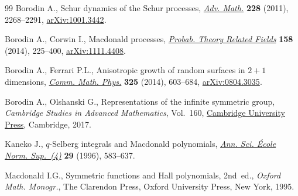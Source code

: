 \documentclass[11pt]{article}
\numberwithin{equation}{section}
\numberwithin{equation}{section}
\begin{document}
\begin{thebibliography}{99}
Borodin A., Schur dynamics of the {S}chur processes, \href{https://doi.org/10.1016/j.aim.2011.06.038}{\textit{Adv. Math.}}
 \textbf{228} (2011), 2268--2291, \href{https://arxiv.org/abs/1001.3442}{arXiv:1001.3442}.

Borodin A., Corwin I., Macdonald processes, \href{https://doi.org/10.1007/s00440-013-0482-3}{\textit{Probab. Theory Related
 Fields}} \textbf{158} (2014), 225--400, \href{https://arxiv.org/abs/1111.4408}{arXiv:1111.4408}.

Borodin A., Ferrari P.L., Anisotropic growth of random surfaces in {$2+1$}
 dimensions, \href{https://doi.org/10.1007/s00220-013-1823-x}{\textit{Comm. Math. Phys.}} \textbf{325} (2014), 603--684,
 \href{https://arxiv.org/abs/0804.3035}{arXiv:0804.3035}.

Borodin A., Olshanski G., Representations of the infinite symmetric group,
 \textit{Cambridge Studies in Advanced Mathematics}, Vol.~160, \href{https://doi.org/10.1017/CBO9781316798577}{Cambridge
 University Press}, Cambridge, 2017.

Kaneko J., {$q$}-{S}elberg integrals and {M}acdonald polynomials, \href{https://doi.org/10.24033/asens.1749}{\textit{Ann.
 Sci. \'{E}cole Norm. Sup.~(4)}} \textbf{29} (1996), 583--637.

Macdonald I.G., Symmetric functions and {H}all polynomials, 2nd~ed., \textit{Oxford Math. Monogr.}, The Clarendon Press, Oxford University Press, New
 York, 1995.

\end{thebibliography}
\end{document}

